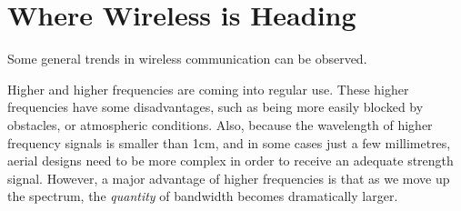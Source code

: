 \section{Where Wireless is Heading}

Some general trends in wireless communication can be observed. 

Higher and higher frequencies are coming into regular use. These higher
frequencies have some disadvantages, such as being more easily blocked
by obstacles, or atmospheric conditions. Also, because the wavelength
of higher frequency signals is smaller than 1cm, and in some cases
just a few millimetres, aerial designs need to be more complex in order
to receive an adequate strength signal. However, a major advantage of
higher frequencies is that as we move up the spectrum, the {\em quantity}
of bandwidth  becomes dramatically larger.
